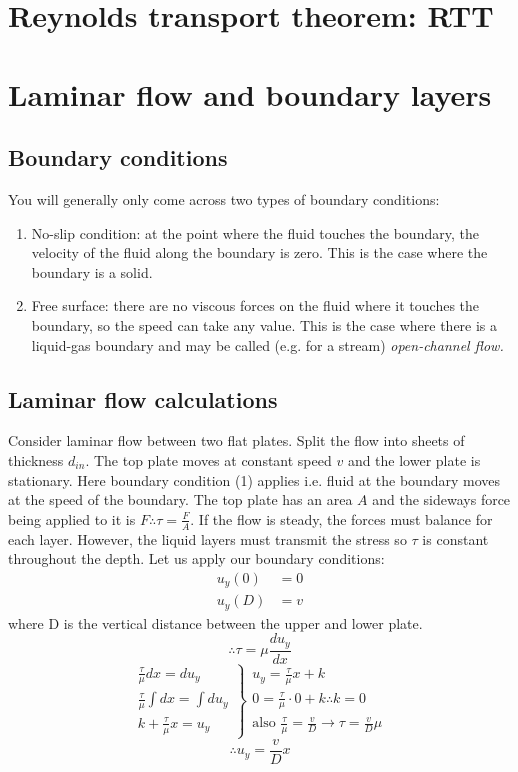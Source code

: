 \documentclass[class=report, crop=false, 12pt,a4paper]{standalone}
\begin{document}
\section{Reynolds transport theorem: RTT}


\section{Laminar flow and boundary layers}
\subsection{Boundary conditions}
You will generally only come across two types of boundary conditions:
\begin{enumerate}[noitemsep]
  \item No-slip condition: at the point where the fluid touches the boundary, the velocity of the fluid along the boundary is zero. This is the case where the boundary is a solid.
  \item Free surface: there are no viscous forces on the fluid where it touches the boundary, so the speed can take any value. This is the case where there is a liquid-gas boundary and may be called (e.g. for a stream) \emph{open-channel flow.}
\end{enumerate}
\subsection{Laminar flow calculations}
Consider laminar flow between two flat plates. Split the flow into sheets of thickness \(d_{in}\). The top plate moves at constant speed \(v\) and the lower plate is stationary. Here boundary condition (1) applies i.e. fluid at the boundary moves at the speed of the boundary. The top plate has an area \(A\) and the sideways force being applied to it is \(F \therefore \tau = \frac{F}{A} \). If the flow is steady, the forces must balance for each layer. However, the liquid layers must transmit the stress so \(\tau\) is constant throughout the depth. Let us apply our boundary conditions:
\begin{align*}
  u_y(0) &= 0 \\ 
  u_y(D) &= v
\end{align*}
where D is the vertical distance between the upper and lower plate.
\[ \therefore \tau = \mu \frac{du_y}{dx} \]
\[
  \left.
    \begin{array}{r}
      \frac{\tau}{\mu} dx = du_y \\
      \frac{\tau}{\mu}\int dx = \int du_y \\
      k + \frac{\tau}{\mu}x = u_y
    \end{array}
  \right\}
  \begin{array}{l}
    u_y = \frac{\tau}{\mu}x + k \\
    0 = \frac{\tau}{\mu}\cdot 0 +k \therefore k = 0 \\
    \textrm{also } \frac{\tau}{\mu} = \frac{v}{D} \rightarrow \tau = \frac{v}{D}\mu
  \end{array}
\]
\[ \therefore u_y = \frac{v}{D}x \]
\end{document}
